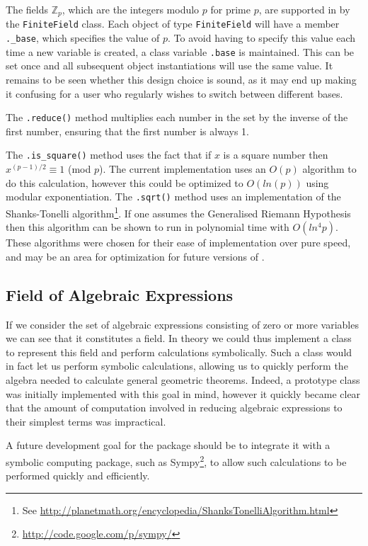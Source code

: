 The fields $\mathbb{Z}_p$, which are the integers modulo $p$ for prime $p$, are supported in \pygeom by the \texttt{FiniteField} class.
Each object of type \texttt{FiniteField} will have a member \texttt{.\_base}, which specifies the value of $p$.
To avoid having to specify this value each time a new variable is created, a class variable \texttt{.base} is maintained.
This can be set once and all subsequent object instantiations will use the same value.
It remains to be seen whether this design choice is sound, as it may end up making it confusing for a user who regularly wishes to switch between different bases.

The \texttt{.reduce()} method multiplies each number in the set by the inverse of the first number, ensuring that the first number is always 1.

The \texttt{.is\_square()} method uses the fact that if $x$ is a square number then $x^{(p-1)/2} \equiv 1$ (mod $p$).
The current implementation uses an $O(p)$ algorithm to do this calculation, however this could be optimized to $O(ln(p))$ using modular exponentiation.
The \texttt{.sqrt()} method uses an implementation of the Shanks-Tonelli algorithm\footnote{See \url{http://planetmath.org/encyclopedia/ShanksTonelliAlgorithm.html}}.
If one assumes the Generalised Riemann Hypothesis then this algorithm can be shown to run in polynomial time with $O(ln^4p)$\cite{Cohen}.
These algorithms were chosen for their ease of implementation over pure speed, and may be an area for optimization for future versions of \pygeom.

\subsection{Field of Algebraic Expressions}

If we consider the set of algebraic expressions consisting of zero or more variables we can see that it constitutes a field.
In theory we could thus implement a class to represent this field and perform calculations symbolically.
Such a class would in fact let us perform symbolic calculations, allowing us to quickly perform the algebra needed to calculate general geometric theorems.
Indeed, a prototype class was initially implemented with this goal in mind, however it quickly became clear that the amount of computation involved in reducing algebraic expressions to their simplest terms was impractical.

A future development goal for the \pygeom package should be to integrate it with a symbolic computing package, such as Sympy\footnote{\url{http://code.google.com/p/sympy/}}, to allow such calculations to be performed quickly and efficiently.

